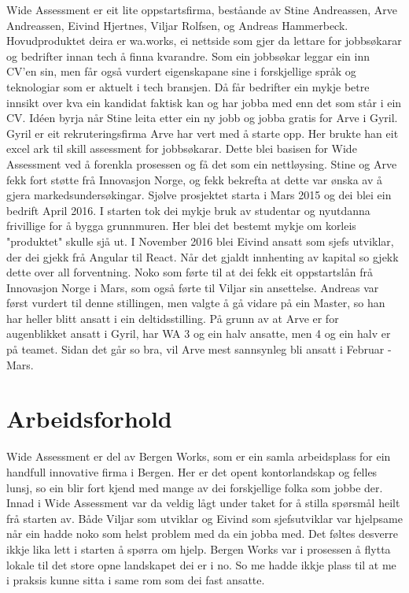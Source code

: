 \documentclass[12pt]{article}
\begin{document}
Wide Assessment er eit lite oppstartsfirma, beståande av Stine Andreassen,
Arve Andreassen, Eivind Hjertnes, Viljar Rolfsen, og Andreas Hammerbeck.
Hovudproduktet deira er wa.works, ei nettside som gjer da lettare for jobbsøkarar
og bedrifter innan tech å finna kvarandre. Som ein jobbsøkar leggar ein inn CV'en
sin, men får også vurdert eigenskapane sine i forskjellige språk og teknologiar
som er aktuelt i tech bransjen. Då får bedrifter ein mykje betre innsikt over
kva ein kandidat faktisk kan og har jobba med enn det som står i ein CV.
Idéen byrja når Stine leita etter ein ny jobb og jobba gratis for Arve i Gyril.
Gyril er eit rekruteringsfirma Arve har vert med å starte opp. Her brukte han
eit excel ark til skill assessment for jobbsøkarar. Dette blei basisen for Wide
Assessment ved å forenkla prosessen og få det som ein nettløysing. Stine og Arve
fekk fort støtte frå Innovasjon Norge, og fekk bekrefta at dette var ønska av å
gjera markedsundersøkingar. Sjølve prosjektet starta i Mars 2015 og dei blei ein
bedrift April 2016. I starten tok dei mykje bruk av studentar og nyutdanna frivillige
for å bygga grunnmuren. Her blei det bestemt mykje om korleis "produktet" skulle
sjå ut. I November 2016 blei Eivind ansatt som sjefs utviklar, der dei gjekk frå
Angular til React. Når det gjaldt innhenting av kapital so gjekk dette over all
forventning. Noko som førte til at dei fekk eit oppstartslån frå Innovasjon Norge
i Mars, som også førte til Viljar sin ansettelse. Andreas var først vurdert til
denne stillingen, men valgte å gå vidare på ein Master, so han har heller blitt
ansatt i ein deltidsstilling. På grunn av at Arve er for augenblikket ansatt i
Gyril, har WA 3 og ein halv ansatte, men 4 og ein halv er på teamet. Sidan det går so
bra, vil Arve mest sannsynleg bli ansatt i Februar - Mars.

\section{Arbeidsforhold}

Wide Assessment er del av Bergen Works, som er ein samla arbeidsplass for ein
handfull innovative firma i Bergen. Her er det opent kontorlandskap og felles
lunsj, so ein blir fort kjend med mange av dei forskjellige folka som jobbe der.
Innad i Wide Assessment var da veldig lågt under taket for å stilla spørsmål heilt
frå starten av. Både Viljar som utviklar og Eivind som sjefsutviklar var hjelpsame
når ein hadde noko som helst problem med da ein jobba med. Det føltes desverre ikkje
lika lett i starten å spørra om hjelp. Bergen Works var i prosessen å flytta lokale
til det store opne landskapet dei er i no. So me hadde ikkje plass til at me i
praksis kunne sitta i same rom som dei fast ansatte.
\end{document}
